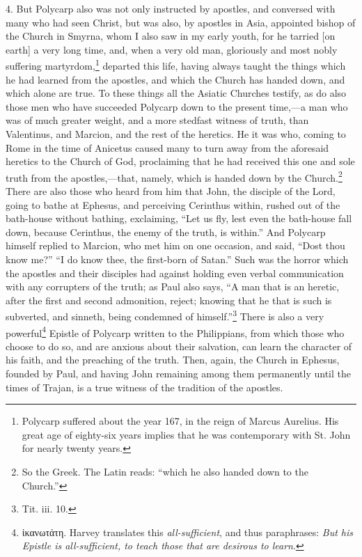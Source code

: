4. But Polycarp also was not only instructed by apostles, and conversed with many who had seen Christ, but was also, by apostles in Asia, appointed bishop of the Church in Smyrna, whom I also saw in my early youth, for he tarried [on earth] a very long time, and, when a very old man, gloriously and most nobly suffering martyrdom,\footnote{Polycarp suffered about the year 167, in the reign of Marcus Aurelius. His great age of eighty-six years implies that he was contemporary with St. John for nearly twenty years.} departed this life, having always taught the things which he had learned from the apostles, and which the Church has handed down, and which alone are true. To these things all the Asiatic Churches testify, as do also those men who have succeeded Polycarp down to the present time,—a man who was of much greater weight, and a more stedfast witness of truth, than Valentinus, and Marcion, and the rest of the heretics. He it was who, coming to Rome in the time of Anicetus caused many to turn away from the aforesaid heretics to the Church of God, proclaiming that he had received this one and sole truth from the apostles,—that, namely, which is handed down by the Church.\footnote{So the Greek. The Latin reads: “which he also handed down to the Church.”} There are also those who heard from him that John, the disciple of the Lord, going to bathe at Ephesus, and perceiving Cerinthus within, rushed out of the bath-house without bathing, exclaiming, “Let us fly, lest even the bath-house fall down, because Cerinthus, the enemy of the truth, is within.” And Polycarp himself replied to Marcion, who met him on one occasion, and said, “Dost thou know me?” “I do know thee, the first-born of Satan.” Such was the horror which the apostles and their disciples had against holding even verbal communication with any corrupters of the truth; as Paul also says, “A man that is an heretic, after the first and second admonition, reject; knowing that he that is such is subverted, and sinneth, being condemned of himself.”\footnote{Tit. iii. 10.} There is also a very powerful\footnote{\textgreek{ἰκανωτάτη}. Harvey translates this \emph{all-sufficient}, and thus paraphrases: \emph{But his Epistle is all-sufficient, to teach those that are desirous to learn}.} Epistle of Polycarp written to the Philippians, from which those who choose to do so, and are anxious about their salvation, can learn the character of his faith, and the preaching of the truth. Then, again, the Church in Ephesus, founded by Paul, and having John remaining among them permanently until the times of Trajan, is a true witness of the tradition of the apostles.

